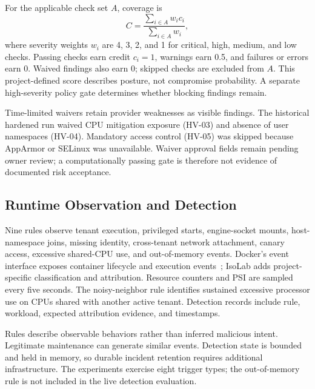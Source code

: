 \documentclass[conference,letterpaper]{IEEEtran}
\begin{document}
For the applicable check set $A$, coverage is
\begin{equation}
C=\frac{\sum_{i\in A} w_i c_i}{\sum_{i\in A} w_i},
\label{eq:coverage}
\end{equation}
where severity weights $w_i$ are 4, 3, 2, and 1 for critical, high, medium, and low checks. Passing checks earn credit $c_i=1$, warnings earn 0.5, and failures or errors earn 0. Waived findings also earn 0; skipped checks are excluded from $A$. This project-defined score describes posture, not compromise probability. A separate high-severity policy gate determines whether blocking findings remain.

Time-limited waivers retain provider weaknesses as visible findings. The historical hardened run waived CPU mitigation exposure (HV-03) and absence of user namespaces (HV-04). Mandatory access control (HV-05) was skipped because AppArmor or SELinux was unavailable. Waiver approval fields remain pending owner review; a computationally passing gate is therefore not evidence of documented risk acceptance.

\subsection{Runtime Observation and Detection}
Nine rules observe tenant execution, privileged starts, engine-socket mounts, host-namespace joins, missing identity, cross-tenant network attachment, canary access, excessive shared-CPU use, and out-of-memory events. Docker's event interface exposes container lifecycle and execution events~\cite{dockerevents}; IsoLab adds project-specific classification and attribution. Resource counters and PSI are sampled every five seconds. The noisy-neighbor rule identifies sustained excessive processor use on CPUs shared with another active tenant. Detection records include rule, workload, expected attribution evidence, and timestamps.

Rules describe observable behaviors rather than inferred malicious intent. Legitimate maintenance can generate similar events. Detection state is bounded and held in memory, so durable incident retention requires additional infrastructure. The experiments exercise eight trigger types; the out-of-memory rule is not included in the live detection evaluation.
\end{document}
